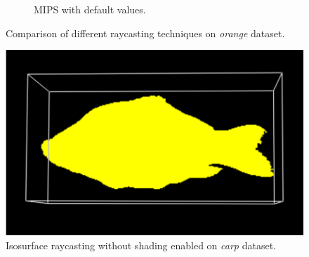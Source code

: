 \documentclass[a4paper]{article}
\begin{document}
\begin{figure}[h]
\begin{subfigure}[b]{0.45\textwidth}
    \caption{MIPS with default values.}
  \end{subfigure}
  \caption{Comparison of different raycasting techniques on \textit{orange} dataset.}
  \label{fig:mipscomp}
\end{figure}

\begin{figure}[h]
  \centering
  \includegraphics[width=\textwidth]{iso-surface}
  \caption{Isosurface raycasting without shading enabled on \textit{carp} dataset.}
  \label{fig:isosurface}
\end{figure}
\end{document}
